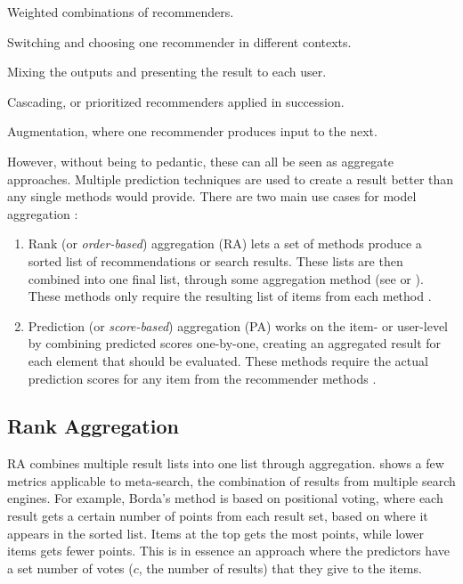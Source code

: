 \begin{itemize*}
  \item Weighted combinations of recommenders.
  \item Switching and choosing one recommender in different contexts.
  \item Mixing the outputs and presenting the result to each user.
  \item Cascading, or prioritized recommenders applied in succession.
  \item Augmentation, where one recommender produces input to the next.
\end{itemize*}

However, without being to pedantic, these can all be seen as aggregate approaches. Multiple prediction techniques are used
to create a result better than any single methods would provide.
There are two main use cases for model aggregation \cite{Liu2007}: 

\begin{enumerate}
  \item Rank (or \emph{order-based}) aggregation (RA) lets a set of methods
  produce a sorted list of recommendations or search results. These lists are then combined
  into one final list, through some aggregation method (see \cite{Dwork2001} or \cite{Klementiev2008}).
  These methods only require the resulting list of items from each method \cite{Aslam2001}.

  \item Prediction (or \emph{score-based}) aggregation (PA) works on the item- or user-level by combining predicted scores
  one-by-one, creating an aggregated result for each element that should be evaluated.
  These methods require the actual prediction scores for any item from the recommender methods \cite[p.2]{Aslam2001}.
\end{enumerate}

\subsection{Rank Aggregation}
\label{sec:theory:rank}

RA combines multiple result lists into one list through aggregation.
\cite{Dwork2001} shows a few metrics applicable to meta-search, the combination of results from multiple search engines.
For example, Borda's method \cite[p.6]{Dwork2001} is based on positional voting, where each result gets a certain number of points from each result set,
based on where it appears in the sorted list. Items at the top gets the most points, while lower items gets fewer points.
This is in essence an approach where the predictors have a set number of votes ($c$, the number of results) that they give to the items.

